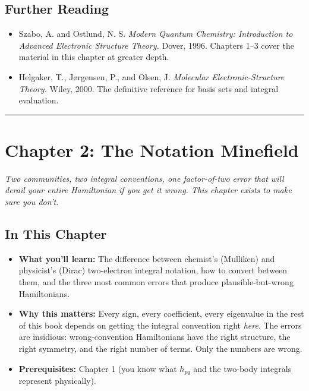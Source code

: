 \documentclass[
  11pt,
  oneside]{book}
\providecommand{\tightlist}{%
  \setlength{\itemsep}{0pt}\setlength{\parskip}{0pt}}
\begin{document}
\section{Further Reading}\label{further-reading}

\begin{itemize}
\tightlist
\item
  Szabo, A. and Ostlund, N. S. \emph{Modern Quantum Chemistry:
  Introduction to Advanced Electronic Structure Theory.} Dover, 1996.
  Chapters 1--3 cover the material in this chapter at greater depth.
\item
  Helgaker, T., Jørgensen, P., and Olsen, J. \emph{Molecular
  Electronic-Structure Theory.} Wiley, 2000. The definitive reference
  for basis sets and integral evaluation.
\end{itemize}

\begin{center}\rule{0.5\linewidth}{0.5pt}\end{center}

\chapter{Chapter 2: The Notation
Minefield}\label{chapter-2-the-notation-minefield}

\emph{Two communities, two integral conventions, one factor-of-two error
that will derail your entire Hamiltonian if you get it wrong. This
chapter exists to make sure you don't.}

\section{In This Chapter}\label{in-this-chapter-1}

\begin{itemize}
\tightlist
\item
  \textbf{What you'll learn:} The difference between chemist's
  (Mulliken) and physicist's (Dirac) two-electron integral notation, how
  to convert between them, and the three most common errors that produce
  plausible-but-wrong Hamiltonians.
\item
  \textbf{Why this matters:} Every sign, every coefficient, every
  eigenvalue in the rest of this book depends on getting the integral
  convention right \emph{here}. The errors are insidious:
  wrong-convention Hamiltonians have the right structure, the right
  symmetry, and the right number of terms. Only the numbers are wrong.
\item
  \textbf{Prerequisites:} Chapter 1 (you know what \(h_{pq}\) and the
  two-body integrals represent physically).
\end{itemize}
\end{document}
